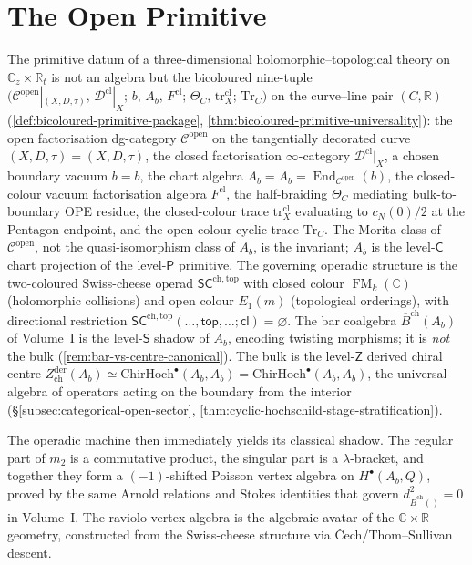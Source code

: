 \documentclass[11pt]{memoir}
\DeclareMathOperator{\FM}{FM}
\DeclareMathOperator{\End}{End}
\providecommand{\cref}[1]{\ref{#1}}
\newcommand{\C}{\mathbb{C}}
\newcommand{\R}{\mathbb{R}}
\providecommand{\cD}{\mathcal{D}}
\providecommand{\cC}{\mathcal{C}}
\newcommand{\SCchtop}{{\mathsf{SC}^{\mathrm{ch,top}}}}
\providecommand{\openFactCat}{\cC^{\mathrm{open}}}
\providecommand{\logCurve}{(X, D, \tau)}
\providecommand{\HalfBraid}{\Theta_{C}}
\providecommand{\TraceC}{\mathrm{Tr}_{C}}
\providecommand{\bdyVac}{b}
\providecommand{\bdyAlg}{A_{b}}
\providecommand{\primPkgBicolour}{\bigl(\openFactCat|_{\logCurve},\, \cD^{\mathrm{cl}}|_{X};\, \bdyVac,\, \bdyAlg,\, F^{\mathrm{cl}};\, \HalfBraid,\, \mathrm{tr}^{\mathrm{cl}}_{X};\, \TraceC\bigr)}
\providecommand{\BarTwc}[1]{\overline{B}^{\mathrm{ch}}(#1)}
\providecommand{\bulkOf}[1]{Z^{\mathrm{der}}_{\mathrm{ch}}(#1)}
\providecommand{\bulkChirHoch}[1]{\mathrm{ChirHoch}^{\bullet}(#1, #1)}
\begin{document}
\part{The Open Primitive}
\label{part:swiss-cheese}
\label{part:open-primitive} %

\noindent
The primitive datum of a three-dimensional holomorphic--topological
theory on $\C_z \times \R_t$ is not an algebra but the bicoloured
nine-tuple
$\primPkgBicolour$
on the curve--line pair $(C, \R)$
\textup(\cref{def:bicoloured-primitive-package},
\cref{thm:bicoloured-primitive-universality}\textup): the open
factorisation dg-category $\openFactCat$ on the tangentially
decorated curve $\logCurve = (X, D, \tau)$, the closed
factorisation $\infty$-category $\cD^{\mathrm{cl}}|_X$, a chosen
boundary vacuum $\bdyVac = b$, the chart algebra
$\bdyAlg = A_b = \End_{\openFactCat}(b)$, the closed-colour vacuum
factorisation algebra $F^{\mathrm{cl}}$, the half-braiding
$\HalfBraid$ mediating bulk-to-boundary OPE residue, the
closed-colour trace $\mathrm{tr}^{\mathrm{cl}}_X$ evaluating to
$c_N(0)/2$ at the Pentagon endpoint, and the open-colour cyclic
trace $\TraceC$. The Morita class of $\openFactCat$, not the
quasi-isomorphism class of $A_b$, is the invariant; $A_b$ is the
level-$\mathsf{C}$ chart projection of the level-$\mathsf{P}$
primitive. The governing operadic structure is the two-coloured
Swiss-cheese operad $\SCchtop$ with closed colour $\FM_k(\C)$
\textup(holomorphic collisions\textup) and open colour $E_1(m)$
\textup(topological orderings\textup), with directional
restriction
$\SCchtop(\ldots, \mathsf{top}, \ldots; \mathsf{cl}) = \varnothing$.
The bar coalgebra $\BarTwc{A_b}$ of Volume~I is the
level-$\mathsf{S}$ shadow of $A_b$, encoding twisting morphisms;
it is \emph{not} the bulk
\textup(\cref{rem:bar-vs-centre-canonical}\textup). The bulk is
the level-$\mathsf{Z}$ derived chiral centre
$\bulkOf{A_b} \simeq \bulkChirHoch{A_b} =
\mathrm{ChirHoch}^\bullet(A_b, A_b)$, the universal algebra of
operators acting on the boundary from the interior
\textup(\S\ref{subsec:categorical-open-sector},
\cref{thm:cyclic-hochschild-stage-stratification}\textup).

The operadic machine then immediately yields its classical shadow.
The regular part of $m_2$ is a commutative product, the singular
part is a $\lambda$-bracket, and together they form a
$(-1)$-shifted Poisson vertex algebra on $H^\bullet(A_b, Q)$,
proved by the same Arnold relations and Stokes identities that
govern $d_{\BarTwc{}}^2 = 0$ in Volume~I. The raviolo vertex
algebra is the algebraic avatar of the $\C \times \R$ geometry,
constructed from the Swiss-cheese structure via
\v{C}ech/Thom--Sullivan descent.
\end{document}
